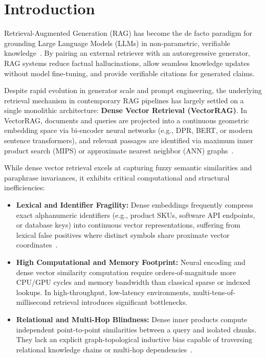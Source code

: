 \documentclass[10pt,twocolumn,letterpaper]{article}
\begin{document}
\begin{abstract}
Downstream generation experiments pairing retrieved context with a sequence-to-sequence language model (\texttt{google/flan-t5-small}, $N = 630$) and natural language inference (NLI) claim entailment confirm that structural alignment directly impacts contextual recall and downstream grounding. The current experimental implementation and stored telemetry passed an independent consistency audit; remaining limitations are addressed explicitly in the paper's threats-to-validity section.
\end{abstract}

\section{Introduction}

Retrieval-Augmented Generation (RAG) has become the de facto paradigm for grounding Large Language Models (LLMs) in non-parametric, verifiable knowledge~\cite{lewis2020retrieval}. By pairing an external retriever with an autoregressive generator, RAG systems reduce factual hallucinations, allow seamless knowledge updates without model fine-tuning, and provide verifiable citations for generated claims.

Despite rapid evolution in generator scale and prompt engineering, the underlying retrieval mechanism in contemporary RAG pipelines has largely settled on a single monolithic architecture: \textbf{Dense Vector Retrieval (VectorRAG)}. In VectorRAG, documents and queries are projected into a continuous geometric embedding space via bi-encoder neural networks (e.g., DPR, BERT, or modern sentence transformers), and relevant passages are identified via maximum inner product search (MIPS) or approximate nearest neighbor (ANN) graphs~\cite{karpukhin2020dense, malkov2018efficient}.

While dense vector retrieval excels at capturing fuzzy semantic similarities and paraphrase invariances, it exhibits critical computational and structural inefficiencies:
\begin{itemize}
    \item \textbf{Lexical and Identifier Fragility:} Dense embeddings frequently compress exact alphanumeric identifiers (e.g., product SKUs, software API endpoints, or database keys) into continuous vector representations, suffering from lexical false positives where distinct symbols share proximate vector coordinates~\cite{thakur2021beir}.
    \item \textbf{High Computational and Memory Footprint:} Neural encoding and dense vector similarity computation require orders-of-magnitude more CPU/GPU cycles and memory bandwidth than classical sparse or indexed lookups. In high-throughput, low-latency environments, multi-tens-of-millisecond retrieval introduces significant bottlenecks.
    \item \textbf{Relational and Multi-Hop Blindness:} Dense inner products compute independent point-to-point similarities between a query and isolated chunks. They lack an explicit graph-topological inductive bias capable of traversing relational knowledge chains or multi-hop dependencies~\cite{edge2024local, yasunaga2021qa}.
\end{itemize}
\end{document}

